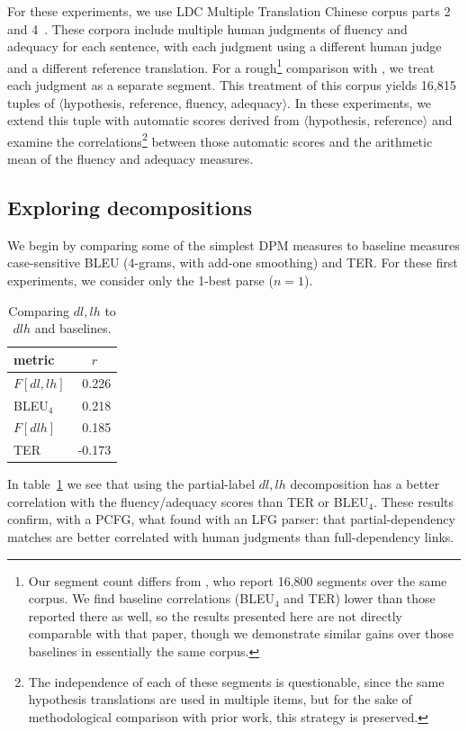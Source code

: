 \documentclass{kluwer}    %
\begin{document}
\begin{article}
For these experiments, we use LDC Multiple Translation Chinese corpus
parts 2~\cite{LDC03MTC2} and 4~\cite{LDC06MTC4}.  These corpora
include multiple human judgments of fluency and adequacy for each
sentence, with each judgment using a different human judge and a
different reference translation.  For a rough\footnote{Our segment
  count differs from , who report
  16,800 segments over the same corpus. We find baseline correlations
  (BLEU$_4$ and TER) lower than those reported there as well, so the
  results presented here are not directly comparable with that paper,
  though we demonstrate similar gains over those baselines in
  essentially the same corpus. %
}
comparison with , we treat each
judgment as a separate segment.
%
This treatment of this corpus yields 16,815 tuples of
$\langle$hypothesis, reference, fluency, adequacy$\rangle$.  In these
experiments, we extend this tuple with automatic scores derived from
$\langle$hypothesis, reference$\rangle$ and examine the
correlations\footnote{The independence of each of these segments is
  questionable, since the same hypothesis translations are used in
  multiple items, but for the sake of methodological comparison with
  prior work, this strategy is preserved.}  between those automatic
scores and the arithmetic mean of the fluency and adequacy measures.

\subsection{Exploring decompositions}
We begin by comparing some of the simplest DPM measures to baseline
measures case-sensitive BLEU (4-grams, with add-one smoothing) and
TER.  For these first experiments, we consider only the 1-best parse
($n=1$).
\begin{table}
  \caption{Comparing $dl,lh$ to $dlh$ and baselines.}
  \label{tab:facorr:subgraphs}
  \begin{tabular*}{2.5in}{lr}
    \hline
    metric  &    \multicolumn{1}{c}{$r$} \\
    \hline
    $F[dl,lh]$ &   0.226 \\
    BLEU$_4$ &   0.218 \\
    $F[dlh]$ &     0.185 \\
    TER &      -0.173 \\
    \hline
  \end{tabular*}
\end{table}
In table~\ref{tab:facorr:subgraphs} we see that using the
partial-label $dl,lh$ decomposition has a better correlation with the
fluency/adequacy scores than TER or BLEU$_4$.  These results confirm,
with a PCFG, what  found with
an LFG parser: that partial-dependency matches are better correlated
with human judgments than full-dependency links.


\end{article}
\end{document}
